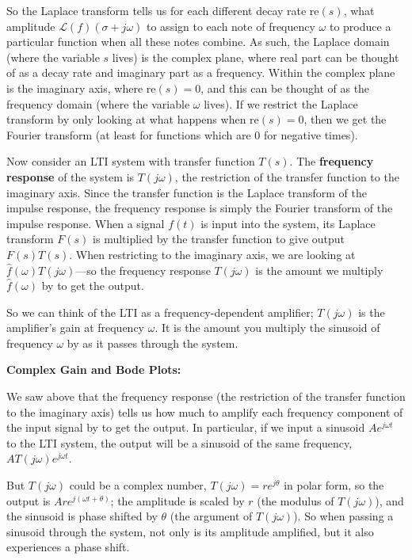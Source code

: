 \documentclass{article}
\begin{document}
So the Laplace transform tells us for each different decay rate $\mathrm{re}(s)$, what amplitude $\mathcal{L}(f)(\sigma+j\omega)$ to assign to each note of frequency $\omega$ to produce a particular function when all these notes combine. As such, the Laplace domain (where the variable $s$ lives) is the complex plane, where real part can be thought of as a decay rate and imaginary part as a frequency. Within the complex plane is the imaginary axis, where $\mathrm{re}(s)=0$, and this can be thought of as the frequency domain (where the variable $\omega$ lives). If we restrict the Laplace transform by only looking at what happens when $\mathrm{re}(s)=0$, then we get the Fourier transform (at least for functions which are 0 for negative times).\bigskip


Now consider an LTI system with transfer function $T(s)$. The \textbf{frequency response} of the system is $T(j\omega)$, the restriction of the transfer function to the imaginary axis. Since the transfer function is the Laplace transform of the impulse response, the frequency response is simply the Fourier transform of the impulse response. When a signal $f(t)$ is input into the system, its Laplace transform $F(s)$ is multiplied by the transfer function to give output $F(s)T(s)$. When restricting to the imaginary axis, we are looking at $\hat{f}(\omega)T(j\omega)$---so the frequency response $T(j\omega)$ is the amount we multiply $\hat{f}(\omega)$ by to get the output.

So we can think of the LTI as a frequency-dependent amplifier; $T(j\omega)$ is the amplifier's gain at frequency $\omega$. It is the amount you multiply the sinusoid of frequency $\omega$ by as it passes through the system.




\clearpage



\textbf{Complex Gain and Bode Plots:}\bigskip


We saw above that the frequency response (the restriction of the transfer function to the imaginary axis) tells us how much to amplify each frequency component of the input signal by to get the output. In particular, if we input a sinusoid $Ae^{j\omega t}$ to the LTI system, the output will be a sinusoid of the same frequency, $AT(j\omega)e^{j\omega t}$.

But $T(j\omega)$ could be a complex number, $T(j\omega) = re^{j\theta}$ in polar form, so the output is $Are^{j(\omega t+\theta)}$; the amplitude is scaled by $r$ (the modulus of $T(j\omega)$), and the sinusoid is phase shifted by $\theta$ (the argument of $T(j\omega)$). So when passing a sinusoid through the system, not only is its amplitude amplified, but it also experiences a phase shift.
\end{document}
